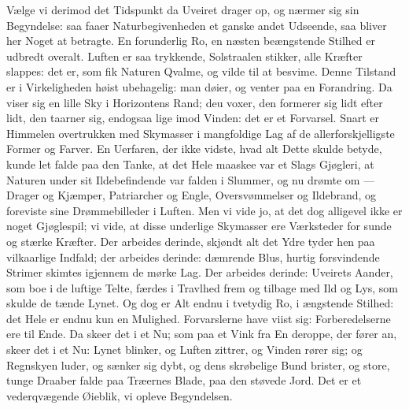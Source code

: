 \documentclass[12pt,a4paper]{book}
\begin{document}
Vælge vi derimod det Tidspunkt da Uveiret drager op, og nærmer sig sin
Begyndelse: saa faaer Naturbegivenheden et ganske andet Udseende, saa bliver her
Noget at betragte. En forunderlig Ro, en næsten beængstende Stilhed er udbredt
overalt. Luften er saa trykkende, Solstraalen stikker, alle Kræfter slappes: det
er, som fik Naturen Qvalme, og vilde til at besvime. Denne Tilstand er i
Virkeligheden høist ubehagelig: man døier, og venter paa en Forandring. Da viser
sig en lille Sky i Horizontens Rand; deu voxer, den formerer sig lidt efter lidt,
den taarner sig, endogsaa lige imod Vinden: det er et Forvarsel. Snart er
Himmelen overtrukken med Skymasser i mangfoldige Lag af de allerforskjelligste
Former og Farver. En Uerfaren, der ikke vidste, hvad alt Dette skulde betyde,
kunde let falde paa den Tanke, at det Hele maaskee var et Slags Gjøgleri, at
Naturen under sit Ildebefindende var falden i Slummer, og nu drømte om --- Drager
og Kjæmper, Patriarcher og Engle, Oversvømmelser og Ildebrand, og foreviste sine
Drømmebilleder i Luften. Men vi vide jo, at det dog alligevel ikke er noget
Gjøglespil; vi vide, at disse underlige Skymasser ere Værksteder for sunde og
stærke Kræfter. Der arbeides derinde, skjøndt alt det Ydre tyder hen paa
vilkaarlige Indfald; der arbeides derinde: dæmrende Blus, hurtig forsvindende
Strimer skimtes igjennem de mørke Lag. Der arbeides derinde: Uveirets Aander,
som boe i de luftige Telte, færdes i Travlhed frem og tilbage med Ild og Lys, som
skulde de tænde Lynet. Og dog er Alt endnu i tvetydig Ro, i ængstende Stilhed:
det Hele er endnu kun en Mulighed. Forvarslerne have viist
sig: Forberedelserne ere til Ende. Da skeer det i et Nu; som paa et Vink fra En
deroppe, der fører an, skeer det i et Nu: Lynet blinker, og Luften zittrer, og
Vinden rører sig; og Regnskyen luder, og sænker sig dybt, og dens skrøbelige Bund
brister, og store, tunge Draaber falde paa Træernes Blade, paa den støvede Jord.
Det er et vederqvægende Øieblik, vi opleve Begyndelsen.
\end{document}
